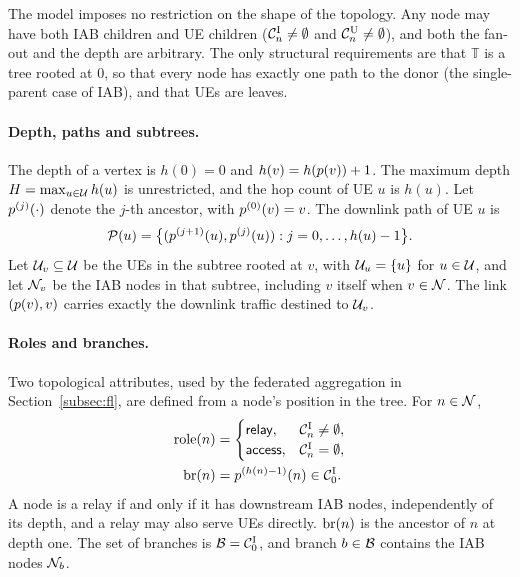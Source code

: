 \begin{EnChapter}
The model imposes no restriction on the shape of the topology. Any node may have
both IAB children and UE children ($\mathcal{C}_n^{\mathrm{I}} \neq \emptyset$ and
$\mathcal{C}_n^{\mathrm{U}} \neq \emptyset$), and both the fan-out and the depth are
arbitrary. The only structural requirements are that $\mathbb{T}$ is a tree rooted
at $0$, so that every node has exactly one path to the donor (the single-parent
case of IAB), and that UEs are leaves.

\paragraph{Depth, paths and subtrees.}
The depth of a vertex is $h(0)=0$ and $h(v) = h(p(v)) + 1$. The maximum depth
$H = \max_{u \in \mathcal{U}} h(u)$ is unrestricted, and the hop count of UE $u$ is
$h(u)$. Let $p^{(j)}(\cdot)$ denote the $j$-th ancestor, with
$p^{(0)}(v) = v$. The downlink path of UE $u$ is
\begin{equation}
  \mathcal{P}(u) = \bigl\{ (p^{(j+1)}(u), p^{(j)}(u)) : j = 0, \dots, h(u)-1 \bigr\}.
\end{equation}
Let $\mathcal{U}_v \subseteq \mathcal{U}$ be the UEs in the subtree rooted at $v$, with
$\mathcal{U}_u = \{u\}$ for $u \in \mathcal{U}$, and let $\mathcal{N}_v$ be the IAB nodes in that
subtree, including $v$ itself when $v \in \mathcal{N}$. The link $(p(v), v)$ carries
exactly the downlink traffic destined to $\mathcal{U}_v$.

\paragraph{Roles and branches.}
Two topological attributes, used by the federated aggregation in
Section~\ref{subsec:fl}, are defined from a node's position in the tree. For
$n \in \mathcal{N}$,
\begin{align}
  \operatorname{role}(n) &=
  \begin{cases}
    \textsf{relay},  & \mathcal{C}_n^{\mathrm{I}} \neq \emptyset, \\
    \textsf{access}, & \mathcal{C}_n^{\mathrm{I}} = \emptyset,
  \end{cases}
  \label{eq:role} \\
  \operatorname{br}(n) &= p^{(h(n)-1)}(n) \in \mathcal{C}_0^{\mathrm{I}}.
  \label{eq:branch}
\end{align}
A node is a relay if and only if it has downstream IAB nodes, independently of its
depth, and a relay may also serve UEs directly. $\operatorname{br}(n)$ is the ancestor of $n$ at
depth one. The set of branches is $\mathcal{B} = \mathcal{C}_0^{\mathrm{I}}$, and branch
$b \in \mathcal{B}$ contains the IAB nodes $\mathcal{N}_b$.


\end{EnChapter}

